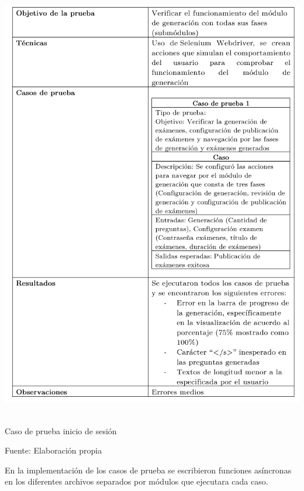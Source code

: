 \documentclass[../Main.tex]{subfiles}
\begin{document}
    \begin{table}[H]
	\begin{Center}
		\includegraphics[width=5.7in,height=7.5in]{Chapters/06ChapterPruebas/images/caso_prueba_react_completo.png}
	    \caption{Caso de prueba inicio de sesión}
	    Fuente: Elaboración propia
        \label{tab:table1}
	\end{Center}
    \end{table}
    
    \newpage
    \begin{justify}
    En la implementación de los casos de prueba se escribieron funciones asíncronas en los diferentes archivos separados por módulos que ejecutara cada caso.
    \end{justify}
    
\end{document}

